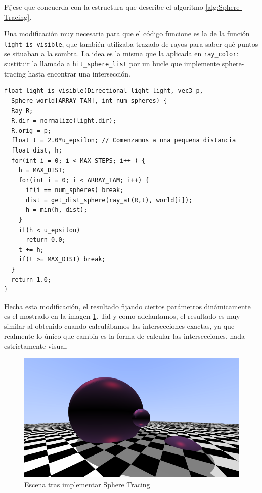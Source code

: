 Fíjese que concuerda con la estructura que describe el algoritmo \ref{alg:Sphere-Tracing}. 

Una modificación muy necesaria para que el código funcione es la de la función \verb|light_is_visible|, que también utilizaba trazado de rayos para saber qué puntos se situaban a la sombra. La idea es la misma que la aplicada en \verb|ray_color|: sustituir la llamada a \verb|hit_sphere_list| por un bucle que implemente sphere-tracing hasta encontrar una intersección.

\begin{lstlisting}
float light_is_visible(Directional_light light, vec3 p, 
  Sphere world[ARRAY_TAM], int num_spheres) {
  Ray R;
  R.dir = normalize(light.dir);
  R.orig = p;
  float t = 2.0*u_epsilon; // Comenzamos a una pequena distancia
  float dist, h;
  for(int i = 0; i < MAX_STEPS; i++ ) {
    h = MAX_DIST;
    for(int i = 0; i < ARRAY_TAM; i++) {
      if(i == num_spheres) break;
      dist = get_dist_sphere(ray_at(R,t), world[i]);
      h = min(h, dist);
    }
    if(h < u_epsilon)
      return 0.0;
    t += h;
    if(t >= MAX_DIST) break;
  }
  return 1.0;
}
\end{lstlisting}

Hecha esta modificación, el resultado fijando ciertos parámetros dinámicamente es el mostrado en la imagen \ref{fig:esferas-ST}. Tal y como adelantamos, el resultado es muy similar al obtenido cuando calculábamos las intersecciones exactas, ya que realmente lo único que cambia es la forma de calcular las intersecciones, nada estrictamente visual.

\begin{figure} [ht]
    \centering
    \includegraphics[scale = 0.35]{img/C8/esferas-sphere-tracing.png}
    \caption{Escena tras implementar Sphere Tracing}
    \label{fig:esferas-ST}
\end{figure}

